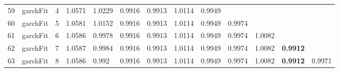 \documentclass[10pt,a4paper]{article}
\begin{document}
\begin{table}[ht]
\begin{tabular}{rlrllllllllll}
  59 & garchFit &     4 & 1.0571 & 1.0229 & 0.9916 & 0.9913 & 1.0114 & 0.9949 &  &  &  &  \\ 
  60 & garchFit &     5 & 1.0581 & 1.0152 & 0.9916 & 0.9913 & 1.0114 & 0.9949 & 0.9974 &  &  &  \\ 
  61 & garchFit &     6 & 1.0586 & 0.9978 & 0.9916 & 0.9913 & 1.0114 & 0.9949 & 0.9974 & 1.0082 &  &  \\ 
  62 & garchFit &     7 & 1.0587 & 0.9984 & 0.9916 & 0.9913 & 1.0114 & 0.9949 & 0.9974 & 1.0082 & \textbf{0.9912} &  \\ 
  63 & garchFit &     8 & 1.0586 & 0.992 & 0.9916 & 0.9913 & 1.0114 & 0.9949 & 0.9974 & 1.0082 & \textbf{0.9912} & 0.9971 \\ 
   \hline
\end{tabular}
\end{table}
\end{document}
